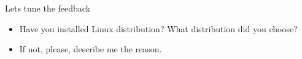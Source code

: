 \begin{frame}{Lets tune the feedback}
\begin{itemize}
    \item Have you installed Linux distribution? What distribution did you choose?
    \item If not, please, describe me the reason.
\end{itemize}
\end{frame}
